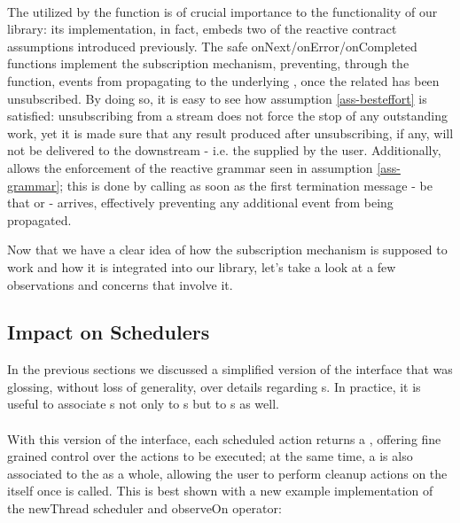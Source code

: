 \\

The  utilized by the  function is of crucial importance to the functionality of our library: its implementation, in fact, embeds two of the reactive contract assumptions introduced previously. The safe onNext/onError/onCompleted functions implement the subscription mechanism, preventing, through the  function, events from propagating to the underlying , once the related  has been unsubscribed. By doing so, it is easy to see how assumption \ref{ass-besteffort} is satisfied: unsubscribing from a stream does not force the stop of any outstanding work, yet it is made sure that any result produced after unsubscribing, if any, will not be delivered to the downstream  - i.e. the  supplied by the user. Additionally,  allows the enforcement of the reactive grammar seen in assumption \ref{ass-grammar}; this is done by calling  as soon as the first termination message - be that  or  - arrives, effectively preventing any additional event from being propagated.

Now that we have a clear idea of how the subscription mechanism is supposed to work and how it is integrated into our library, let's take a look at a few observations and concerns that involve it. 

\subsection{Impact on Schedulers}

In the previous sections we discussed a simplified version of the  interface that was glossing, without loss of generality, over details regarding s. In practice, it is useful to associate s not only to s but to s as well. \\

\\

With this version of the interface, each scheduled action returns a , offering fine grained control over the actions to be executed; at the same time, a  is also associated to the  as a whole, allowing the user to perform cleanup actions on the  itself once  is called. This is best shown with a new example implementation of the newThread scheduler and observeOn operator:\\

